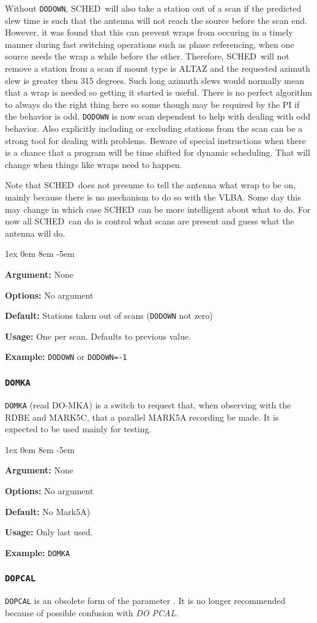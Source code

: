 \documentclass{report}
\newcommand{\schedb}{{\sc SCHED~}}
\newcommand{\rcwbox}[5]{
  \begin{list}{}{\parsep 1ex  \itemsep 0em
                 \leftmargin 8em  \itemindent -5em }
    \item {\bf Argument:} #1
    \item {\bf Options:}  #2
    \item {\bf Default:}  #3
    \item {\bf Usage:}    #4
    \item {\bf Example:}  #5
  \end{list}
}
\begin{document}
Without {\tt DODOWN}, \schedb will also take a station out of a scan
if the predicted slew time is such that the antenna will not reach the
source before the scan end.  However, it was found that this can
prevent wraps from occuring in a timely manner during fast switching
operations such as phase referencing, when one source needs the wrap a
while before the other.  Therefore, \schedb will not remove a station
from a scan if mount type is ALTAZ and the requested azimuth slew is
greater then 315 degrees.  Such long azimuth slews would normally mean
that a wrap is needed so getting it started is useful.  There is no
perfect algorithm to always do the right thing here so some though may
be required by the PI if the behavior is odd.  {\tt DODOWN} is now
scan dependent to help with dealing with odd behavior.  Also
explicitly including or excluding stations from the scan can be a
strong tool for dealing with problems.  Beware of special instructions
when there is a chance that a program will be time shifted for dynamic
scheduling.  That will change when things like wraps need to happen.

Note that \schedb does not presume to tell the antenna what wrap to be
on, mainly because there is no mechanism to do so with the VLBA.  Some
day this may change in which case \schedb can be more intelligent
about what to do.  For now all \schedb can do is control what scans
are present and guess what the antenna will do.

\rcwbox
{None}
{No argument}
{Stations taken out of scans ({\tt DODOWN} not zero)}
{One per scan.  Defaults to previous value.}
{{\tt DODOWN} or {\tt DODOWN=-1}}


\subsubsection{\label{MP:DOMKA}{\tt DOMKA}}

{\tt DOMKA} (read DO-MKA) is a switch to request that, when observing
with the RDBE and MARK5C, that a parallel MARK5A recording be made.
It is expected to be used mainly for testing.

\rcwbox
{None}
{No argument}
{No Mark5A)}
{Only last used.}
{{\tt DOMKA}}



\subsubsection{\label{MP:DOPCAL}{\tt DOPCAL}}

{\tt DOPCAL} is an obsolete form of the parameter
.
It is no longer recommended because of possible confusion with
{\em DO PCAL}.
\end{document}
